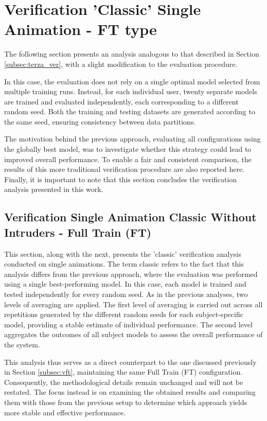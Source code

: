 \documentclass[12pt]{report}
\begin{document}
\section{Verification ’Classic’ Single Animation - FT type}

The following section presents an analysis analogous to that described in Section \ref{subsec:terza_ver}, with a slight modification to the evaluation procedure.

In this case, the evaluation does not rely on a single optimal model selected from multiple training runs.
Instead, for each individual user, twenty separate models are trained and evaluated independently, each corresponding to a different random seed.
Both the training and testing datasets are generated according to the same seed, ensuring consistency between data partitions.

The motivation behind the previous approach, evaluating all configurations using the globally best model, was to investigate whether this strategy could lead to improved overall performance.
To enable a fair and consistent comparison, the results of this more traditional verification procedure are also reported here.
Finally, it is important to note that this section concludes the verification analysis presented in this work.

\subsection{Verification Single Animation Classic Without Intruders - Full Train (FT)}

This section, along with the next, presents the 'classic' verification analysis conducted on single animations.
The term classic refers to the fact that this analysis differs from the previous approach, where the evaluation was performed using a single best-performing model.
In this case, each model is trained and tested independently for every random seed.
As in the previous analyses, two levels of averaging are applied. 
The first level of averaging is carried out across all repetitions generated by the different random seeds for each subject-specific model, providing a stable estimate of individual performance. 
The second level aggregates the outcomes of all subject models to assess the overall performance of the system.

This analysis thus serves as a direct counterpart to the one discussed previously in Section \ref{subsec:vft}, maintaining the same Full Train (FT) configuration. 
Consequently, the methodological details remain unchanged and will not be restated. 
The focus instead is on examining the obtained results and comparing them with those from the previous setup to determine which approach yields more stable and effective performance.
\end{document}
